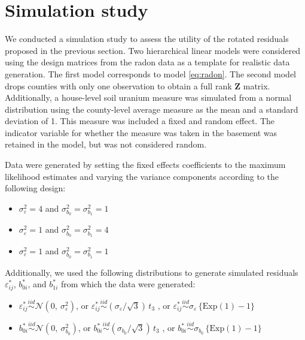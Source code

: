 \documentclass{article} %
\newcommand{\al}[1]{{\color{red} #1}}
\begin{document}
\section{Simulation study}\label{sec:simulation}
\al{
We conducted a simulation study to assess the utility of the rotated residuals proposed in the previous section. Two hierarchical linear models were considered using the design matrices from the radon data as a template for realistic data generation. The first model corresponds to model \eqref{eq:radon}. The second model drops counties with only one observation to obtain a full rank $\bm{Z}$ matrix. Additionally, a house-level soil uranium measure was simulated from a normal distribution using the county-level average measure as the mean and a standard deviation of 1. This measure was included a fixed and random effect. The indicator variable for whether the measure was taken in the basement was retained in the model, but was not considered random.

Data were generated by setting the fixed effects coefficients to the maximum likelihood estimates and varying the variance components according to the following design:
%
\begin{itemize}
\item $\sigma^2_\varepsilon = 4$ and  $\sigma^2_{b_0} = \sigma^2_{b_1} = 1$
\item $\sigma^2_\varepsilon = 1$ and  $\sigma^2_{b_0} = \sigma^2_{b_1} = 4$
\item $\sigma^2_\varepsilon = 1$ and  $\sigma^2_{b_0} = \sigma^2_{b_1} = 1$
\end{itemize}
%
Additionally, we used the following distributions to generate simulated residuals $\varepsilon_{ij}^*$, $b_{0i}^*$, and $b_{1i}^*$ from which the data were generated:
%
\begin{itemize}
\item $\varepsilon_{ij}^* \overset{iid}{\sim} \mathcal{N}(0, \ \sigma^2_{\varepsilon})$, or $\varepsilon_{ij}^* \overset{iid}{\sim} (\sigma_{\varepsilon} / \sqrt{3})\, t_3$ , or $\varepsilon_{ij}^* \overset{iid}{\sim} \sigma_{\varepsilon} \, \{ \text{Exp}(1) - 1 \}$

\item $b_{0i}^* \overset{iid}{\sim} \mathcal{N}(0, \ \sigma^2_{b_{0}})$, or $b_{0i}^* \overset{iid}{\sim} (\sigma_{b_{0}} / \sqrt{3})\, t_3$ , or $b_{0i}^* \overset{iid}{\sim} \sigma_{b_{0}} \, \{ \text{Exp}(1) - 1 \}$


\end{itemize}}
\end{document}
